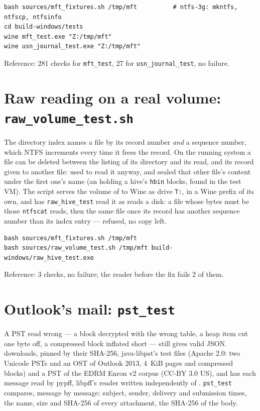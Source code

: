 \documentclass[11pt,a4paper,oneside]{report}
\begin{document}
\begin{lstlisting}
bash sources/mft_fixtures.sh /tmp/mft          # ntfs-3g: mkntfs, ntfscp, ntfsinfo
cd build-windows/tests
wine mft_test.exe "Z:/tmp/mft"
wine usn_journal_test.exe "Z:/tmp/mft"
\end{lstlisting}

Reference: 281 checks for \texttt{mft\_test}, 27 for
\texttt{usn\_journal\_test}, no failure.

\section{Raw reading on a real volume: \texttt{raw\_volume\_test.sh}}

The directory index names a file by its record number \emph{and} a sequence
number, which NTFS increments every time it frees the record. On the running
system a file can be deleted between the listing of its directory and its
read, and its record given to another file: \wac{} used to read it anyway,
and sealed that other file's content under the first one's name (an
 holding a hive's \texttt{hbin} blocks, found in the test
VM). The script serves the volume of  to Wine as
drive \texttt{T:}, in a Wine prefix of its own, and has
\texttt{raw\_hive\_test} read it as \wac{} reads a disk: a file whose bytes
must be those \texttt{ntfscat} reads, then the same file once its record has
another sequence number than its index entry — refused, no copy left.

\begin{lstlisting}
bash sources/mft_fixtures.sh /tmp/mft
bash sources/raw_volume_test.sh /tmp/mft build-windows/raw_hive_test.exe
\end{lstlisting}

Reference: 3 checks, no failure; the reader before the fix fails 2 of them.

\section{Outlook's mail: \texttt{pst\_test}}

A PST read wrong — a block decrypted with the wrong table, a heap item cut one
byte off, a compressed block inflated short — still gives valid JSON.
 downloads, pinned by their SHA-256, java-libpst's
test files (Apache 2.0: two Unicode PSTs and an OST of Outlook 2013, 4~KiB
pages and compressed blocks) and a PST of the EDRM Enron v2 corpus (CC-BY 3.0
US), and has each message read by pypff, libpff's reader written independently
of \wac{}. \texttt{pst\_test} compares, message by message: subject, sender,
delivery and submission times, the name, size and SHA-256 of every
attachment, the SHA-256 of the body.
\end{document}
